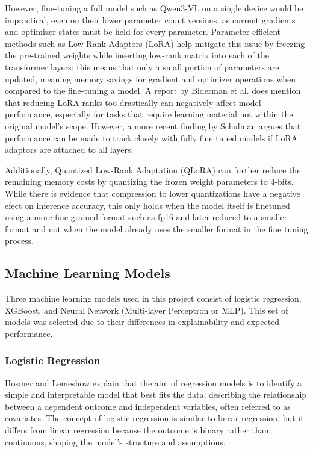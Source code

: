 \documentclass[ %
                    author={Natchalin Iwsakul \\[0.4em] Inkaphol Siriwongwattana \\[0.4em] Tanaphan Kummaraphat \\[0.6em] Patorn Srisupap},,
                supervisor={Fernando Moreno-Pino},
                    degree={MSc},
                     title={Propensity Modelling for SME Commercial Lending Using Open Public Data
},
                  subtitle={Companies House and GDELT as predictors of first-time borrowing},
                      type={},
                      year={2026}]{dissertation}
\begin{document}
However, fine-tuning a full model such as Qwen3-VL on a single device would be impractical, even on their lower parameter count versions, as current gradients and optimizer states must be held for every parameter. Parameter-efficient methods such as Low Rank Adaptors (LoRA)\cite{hu2021} help mitigate this issue by freezing the pre-trained weights while inserting low-rank matrix into each of the transformer layers; this means that only a small portion of parameters are updated, meaning memory savings for gradient and optimizer operations when compared to the fine-tuning a model. A report by Biderman et al. \cite{biderman2024lora} does mention that reducing LoRA ranks too drastically can negatively affect model performance, especially for tasks that require learning material not within the original model's scope. However, a more recent finding by Schulman \cite{schulman2025lora} argues that performance can be made to track closely with fully fine tuned models if LoRA adaptors are attached to all layers. 

Additionally, Quantized Low-Rank Adaptation (QLoRA) \cite{dettmers2023} can further reduce the remaining memory costs by quantizing the frozen weight parameters to 4-bits. While there is evidence that compression to lower quantizations have a negative efect on inference accuracy, this only holds when the model itself is finetuned using a more fine-grained format such as fp16 and later reduced to a smaller format and not when the model already uses the smaller format in the fine tuning process\cite{dettmers2022}.


\subsection{Machine Learning Models}
\label{sec:mlmodels}
Three machine learning models used in this project consist of logistic regression, XGBoost, and Neural Network (Multi-layer Perceptron or MLP). This set of models was selected due to their differences in explainability and expected performance. 

\subsubsection{Logistic Regression}
\label{sec:logisticregression}

Hosmer and Lemeshow \cite{hosmer_applied_2013} explain that the aim of regression models is to identify a simple and interpretable model that best fits the data, describing the relationship between a dependent outcome and independent variables, often referred to as covariates. The concept of logistic regression is similar to linear regression, but it differs from linear regression because the outcome is binary rather than continuous, shaping the model's structure and assumptions.
\end{document}
